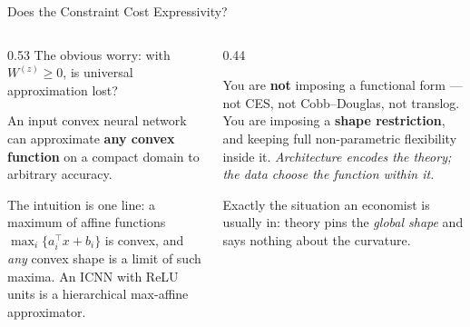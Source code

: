 \begin{frame}{Does the Constraint Cost Expressivity?}
\begin{columns}[T]
\begin{column}{0.53\textwidth}
\small
The obvious worry: with $W^{(z)}\ge0$, is universal approximation lost?
\medskip

\begin{conceptbox}[title=\textbf{Theorem (Chen, Shi \& Zhang, 2019)}]\small
An input convex neural network can approximate \textbf{any convex function} on a compact domain to arbitrary accuracy.
\end{conceptbox}
\medskip

The intuition is one line: a maximum of affine functions $\max_i\{a_i^{\top}x+b_i\}$ is convex, and \emph{any} convex shape is a limit of such maxima. An ICNN with ReLU units is a hierarchical max-affine approximator.
\end{column}
\begin{column}{0.44\textwidth}
\begin{takeawaybox}[title=\textbf{The reading that matters}]\small
You are \textbf{not} imposing a functional form --- not CES, not Cobb--Douglas, not translog.
\medskip
You are imposing a \textbf{shape restriction}, and keeping full non-parametric flexibility inside it.
\medskip
\emph{Architecture encodes the theory; the data choose the function within it.}
\end{takeawaybox}
\medskip
\begin{examplebox}\footnotesize
Exactly the situation an economist is usually in: theory pins the \emph{global shape} and says nothing about the curvature.
\end{examplebox}
\end{column}
\end{columns}
\vspace{1mm}
\end{frame}

